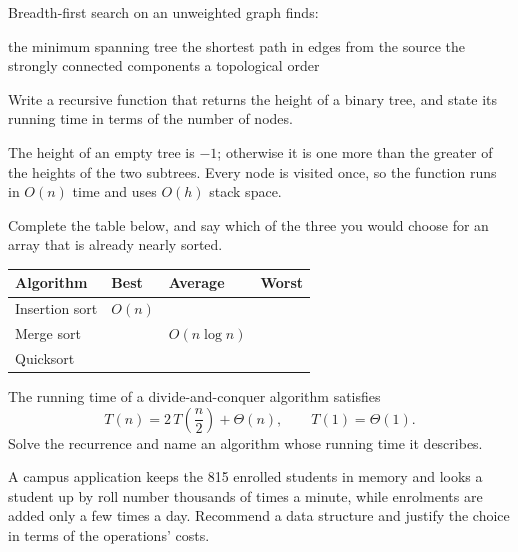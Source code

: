 \documentclass[type=final]{saus-exam}
\begin{document}
\question[marks=2, clo=2, bloom=Apply, topic=Graphs]
Breadth-first search on an unweighted graph finds:
\begin{choices}
  \choice the minimum spanning tree
  \correctchoice the shortest path in edges from the source
  \choice the strongly connected components
  \choice a topological order
\end{choices}


\question[marks=5, clo=2, bloom=Apply, topic=Recursion]
Write a recursive function that returns the height of a binary tree, and
state its running time in terms of the number of nodes.
\begin{solution}
  The height of an empty tree is $-1$; otherwise it is one more than the
  greater of the heights of the two subtrees. Every node is visited once, so
  the function runs in $O(n)$ time and uses $O(h)$ stack space.
\end{solution}

\question[marks=5, clo=2, bloom=Analyse, topic=Sorting]
Complete the table below, and say which of the three you would choose for
an array that is already nearly sorted.
\begin{center}
  \small
  \begin{tabular}{|l|l|l|l|}
    \hline
    \rowcolor{sausmist}
    \textbf{Algorithm}&\textbf{Best}&\textbf{Average}&\textbf{Worst}\\
    \hline
    Insertion sort&$O(n)$&&\\
    \hline
    Merge sort&&$O(n\log n)$&\\
    \hline
    Quicksort&&&\\
    \hline
  \end{tabular}
\end{center}

\question[marks=5, clo=3, bloom=Analyse, topic=Complexity]
The running time of a divide-and-conquer algorithm satisfies
\begin{equation*}
  T(n) = 2\,T\!\left(\frac{n}{2}\right) + \Theta(n), \qquad T(1)=\Theta(1).
\end{equation*}
Solve the recurrence and name an algorithm whose running time it describes.

\question[marks=5, clo=3, bloom=Evaluate, topic=Data structure choice,
          lines=6]
A campus application keeps the 815 enrolled students in memory and looks a
student up by roll number thousands of times a minute, while enrolments are
added only a few times a day. Recommend a data structure and justify the
choice in terms of the operations' costs.
\end{document}
